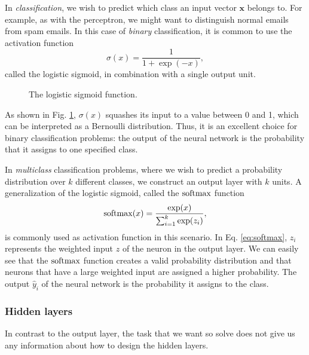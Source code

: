 In \emph{classification}, we wish to predict which class an input vector $\bm{x}$ belongs to. For example, as with the perceptron, we might want to distinguish normal emails from spam emails. In this case of \emph{binary} classification, it is common to use the activation function
\begin{equation}
\sigma(x) = \frac1{1+\exp(-x)},
\end{equation}
called the logistic sigmoid, in combination with a single output unit.
\begin{figure}
	\begin{center}
		
	\end{center}
	\caption{The logistic sigmoid function.}
	\label{fig:sigmoid}
\end{figure}
As shown in Fig. \ref{fig:sigmoid}, $\sigma(x)$ squashes its input to a value between 0 and 1, which can be interpreted as a Bernoulli distribution. Thus, it is an excellent choice for binary classification problems: the output of the neural network is the probability that it assigns to one specified class.

In \emph{multiclass} classification problems, where we wish to predict a probability distribution over $k$ different classes, we construct an output layer with $k$ units. A generalization of the logistic sigmoid, called the $\operatorname{softmax}$ function
\begin{equation}\label{eq:softmax}
\operatorname{softmax}(x) = \frac{\exp(x)}{\sum_{i=1}^{k}\exp(z_i)},
\end{equation}
is commonly used as activation function in this scenario. In Eq. \eqref{eq:softmax}, $z_i$ represents the weighted input $z$ of the  neuron in the output layer. We can easily see that the $\operatorname{softmax}$ function creates a valid probability distribution and that neurons that have a large weighted input are assigned a higher probability. The output $\hat{y}_i$ of the neural network is the probability it assigns to the  class.

\subsubsection{Hidden layers}
In contrast to the output layer, the task that we want so solve does not give us any information about how to design the hidden layers. 